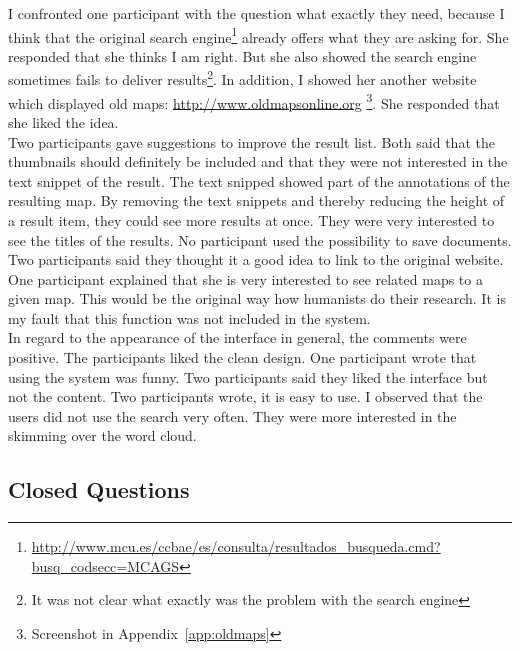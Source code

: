 \documentclass[11pt]{report}
\begin{document}
I confronted one participant with the question what exactly they need, because I think that the original search engine\footnote{\url{http://www.mcu.es/ccbae/es/consulta/resultados_busqueda.cmd?busq_codsecc=MCAGS}} already offers what they are asking for. She responded that she thinks I am right. But she also showed the search engine sometimes fails to deliver results\footnote{It was not clear what exactly was the problem with the search engine}. In addition, I showed her another website which displayed old maps: \url{http://www.oldmapsonline.org} \footnote{Screenshot in Appendix~\ref{app:oldmaps}}. She responded that she liked the idea. \\

Two participants gave suggestions to improve the result list. Both said that the thumbnails should definitely be included and that they were not interested in the text snippet of the result. The text snipped showed part of the annotations of the resulting map. By removing the text snippets and thereby reducing the height of a result item, they could see more results at once. They were very interested to see the titles of the results. No participant used the possibility to save documents. Two participants said they thought it a good idea to link to the original website. One participant explained that she is very interested to see related maps to a given map. This would be the original way how humanists do their research. It is my fault that this function was not included in the system. \\

In regard to the appearance of the interface in general, the comments were positive. The participants liked the clean design. One participant wrote that using the system was funny. Two participants said they liked the interface but not the content. Two participants wrote, it is easy to use. I observed that the users did not use the search very often. They were more interested in the skimming over the word cloud.

\subsection{Closed Questions}
\end{document}
